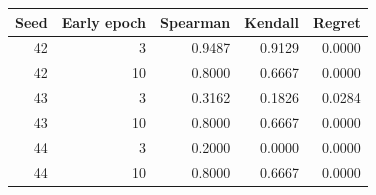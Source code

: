 \begin{tabular}{rrrrr}
\toprule
Seed & Early epoch & Spearman & Kendall & Regret \\
\midrule
42 & 3 & 0.9487 & 0.9129 & 0.0000 \\
42 & 10 & 0.8000 & 0.6667 & 0.0000 \\
43 & 3 & 0.3162 & 0.1826 & 0.0284 \\
43 & 10 & 0.8000 & 0.6667 & 0.0000 \\
44 & 3 & 0.2000 & 0.0000 & 0.0000 \\
44 & 10 & 0.8000 & 0.6667 & 0.0000 \\
\bottomrule
\end{tabular}
